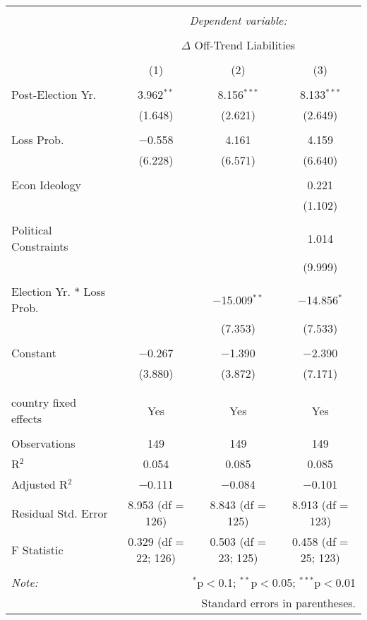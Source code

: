 
\begingroup 
\footnotesize 
\begin{tabular}{@{\extracolsep{5pt}}lccc} 
\\[-1.8ex]\hline 
\hline \\[-1.8ex] 
 & \multicolumn{3}{c}{\textit{Dependent variable:}} \\ 
\cline{2-4} 
\\[-1.8ex] & \multicolumn{3}{c}{$\Delta$ Off-Trend Liabilities} \\ 
\\[-1.8ex] & (1) & (2) & (3)\\ 
\hline \\[-1.8ex] 
 Post-Election Yr. & 3.962$^{**}$ & 8.156$^{***}$ & 8.133$^{***}$ \\ 
  & (1.648) & (2.621) & (2.649) \\ 
  & & & \\ 
 Loss Prob. & $-$0.558 & 4.161 & 4.159 \\ 
  & (6.228) & (6.571) & (6.640) \\ 
  & & & \\ 
 Econ Ideology &  &  & 0.221 \\ 
  &  &  & (1.102) \\ 
  & & & \\ 
 Political Constraints &  &  & 1.014 \\ 
  &  &  & (9.999) \\ 
  & & & \\ 
 Election Yr. * Loss Prob. &  & $-$15.009$^{**}$ & $-$14.856$^{*}$ \\ 
  &  & (7.353) & (7.533) \\ 
  & & & \\ 
 Constant & $-$0.267 & $-$1.390 & $-$2.390 \\ 
  & (3.880) & (3.872) & (7.171) \\ 
  & & & \\ 
\hline \\[-1.8ex] 
country fixed effects & Yes & Yes & Yes \\ 
\hline \\[-1.8ex] 
Observations & 149 & 149 & 149 \\ 
R$^{2}$ & 0.054 & 0.085 & 0.085 \\ 
Adjusted R$^{2}$ & $-$0.111 & $-$0.084 & $-$0.101 \\ 
Residual Std. Error & 8.953 (df = 126) & 8.843 (df = 125) & 8.913 (df = 123) \\ 
F Statistic & 0.329 (df = 22; 126) & 0.503 (df = 23; 125) & 0.458 (df = 25; 123) \\ 
\hline 
\hline \\[-1.8ex] 
\textit{Note:}  & \multicolumn{3}{r}{$^{*}$p$<$0.1; $^{**}$p$<$0.05; $^{***}$p$<$0.01} \\ 
 & \multicolumn{3}{r}{Standard errors in parentheses.} \\ 
\end{tabular} 
\endgroup 
